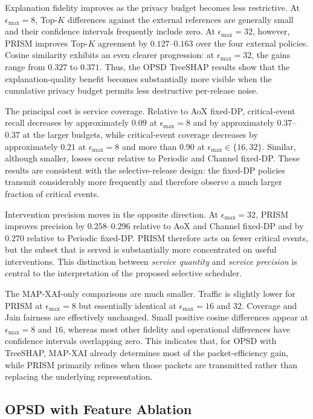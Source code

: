 \documentclass[11pt]{article}
\begin{document}
Explanation fidelity improves as the privacy budget becomes less restrictive. At $\epsilon_{\max}=8$, Top-$K$ differences against the external references are generally small and their confidence intervals frequently include zero. At $\epsilon_{\max}=32$, however, PRISM improves Top-$K$ agreement by $0.127$--$0.163$ over the four external policies. Cosine similarity exhibits an even clearer progression: at $\epsilon_{\max}=32$, the gains range from $0.327$ to $0.371$. Thus, the OPSD TreeSHAP results show that the explanation-quality benefit becomes substantially more visible when the cumulative privacy budget permits less destructive per-release noise.

The principal cost is service coverage. Relative to AoX fixed-DP, critical-event recall decreases by approximately $0.09$ at $\epsilon_{\max}=8$ and by approximately $0.37$--$0.37$ at the larger budgets, while critical-event coverage decreases by approximately $0.21$ at $\epsilon_{\max}=8$ and more than $0.90$ at $\epsilon_{\max}\in\{16,32\}$. Similar, although smaller, losses occur relative to Periodic and Channel fixed-DP. These results are consistent with the selective-release design: the fixed-DP policies transmit considerably more frequently and therefore observe a much larger fraction of critical events.

Intervention precision moves in the opposite direction. At $\epsilon_{\max}=32$, PRISM improves precision by $0.258$--$0.296$ relative to AoX and Channel fixed-DP and by $0.270$ relative to Periodic fixed-DP. PRISM therefore acts on fewer critical events, but the subset that is served is substantially more concentrated on useful interventions. This distinction between \emph{service quantity} and \emph{service precision} is central to the interpretation of the proposed selective scheduler.

The MAP-XAI-only comparisons are much smaller. Traffic is slightly lower for PRISM at $\epsilon_{\max}=8$ but essentially identical at $\epsilon_{\max}=16$ and $32$. Coverage and Jain fairness are effectively unchanged. Small positive cosine differences appear at $\epsilon_{\max}=8$ and $16$, whereas most other fidelity and operational differences have confidence intervals overlapping zero. This indicates that, for OPSD with TreeSHAP, MAP-XAI already determines most of the packet-efficiency gain, while PRISM primarily refines when those packets are transmitted rather than replacing the underlying representation.

\subsection{OPSD with Feature Ablation}
\end{document}

